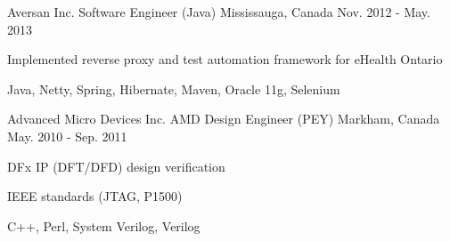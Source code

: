 \begin{cventries}
  \cventry
    {Aversan Inc.} %
    {Software Engineer (Java)} %
    {Mississauga, Canada} %
    {Nov. 2012 - May. 2013} %
    {
      \begin{cvitems} %
        \item {Implemented reverse proxy and test automation framework for eHealth Ontario}
        \item {Java, Netty, Spring, Hibernate, Maven, Oracle 11g, Selenium}
      \end{cvitems}
    }

  \cventry
    {Advanced Micro Devices Inc.} %
    {AMD Design Engineer (PEY)} %
    {Markham, Canada} %
    {May. 2010 - Sep. 2011} %
    {
      \begin{cvitems} %
        \item {DFx IP (DFT/DFD) design verification}
        \item {IEEE standards (JTAG, P1500)}
        \item {C++, Perl, System Verilog, Verilog}
      \end{cvitems}
    }

\end{cventries}

